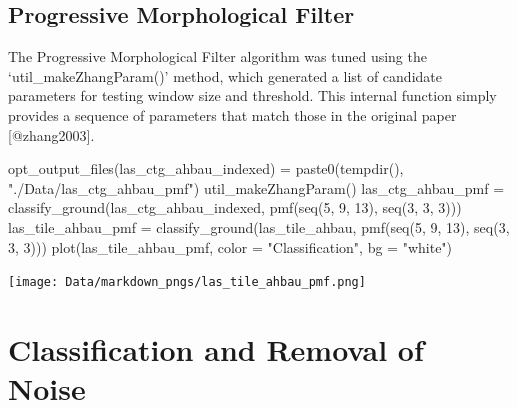 \documentclass[
]{article}
\newenvironment{Shaded}{\begin{snugshade}}{\end{snugshade}}
\newcommand{\AttributeTok}[1]{\textcolor[rgb]{0.77,0.63,0.00}{#1}}
\newcommand{\DecValTok}[1]{\textcolor[rgb]{0.00,0.00,0.81}{#1}}
\newcommand{\FunctionTok}[1]{\textcolor[rgb]{0.00,0.00,0.00}{#1}}
\newcommand{\NormalTok}[1]{#1}
\newcommand{\OtherTok}[1]{\textcolor[rgb]{0.56,0.35,0.01}{#1}}
\newcommand{\StringTok}[1]{\textcolor[rgb]{0.31,0.60,0.02}{#1}}
\begin{document}
\hypertarget{progressive-morphological-filter}{%
\subsection{Progressive Morphological
Filter}\label{progressive-morphological-filter}}

The Progressive Morphological Filter algorithm was tuned using the
`util\_makeZhangParam()' method, which generated a list of candidate
parameters for testing window size and threshold. This internal function
simply provides a sequence of parameters that match those in the
original paper {[}@zhang2003{]}.

\begin{Shaded}
\begin{Highlighting}[]
\FunctionTok{opt\_output\_files}\NormalTok{(las\_ctg\_ahbau\_indexed) }\OtherTok{=}  \FunctionTok{paste0}\NormalTok{(}\FunctionTok{tempdir}\NormalTok{(), }\StringTok{"./Data/las\_ctg\_ahbau\_pmf"}\NormalTok{)}
\FunctionTok{util\_makeZhangParam}\NormalTok{()}
\NormalTok{las\_ctg\_ahbau\_pmf }\OtherTok{=} \FunctionTok{classify\_ground}\NormalTok{(las\_ctg\_ahbau\_indexed, }\FunctionTok{pmf}\NormalTok{(}\FunctionTok{seq}\NormalTok{(}\DecValTok{5}\NormalTok{, }\DecValTok{9}\NormalTok{, }\DecValTok{13}\NormalTok{), }\FunctionTok{seq}\NormalTok{(}\DecValTok{3}\NormalTok{, }\DecValTok{3}\NormalTok{, }\DecValTok{3}\NormalTok{)))}
\NormalTok{las\_tile\_ahbau\_pmf }\OtherTok{=} \FunctionTok{classify\_ground}\NormalTok{(las\_tile\_ahbau, }\FunctionTok{pmf}\NormalTok{(}\FunctionTok{seq}\NormalTok{(}\DecValTok{5}\NormalTok{, }\DecValTok{9}\NormalTok{, }\DecValTok{13}\NormalTok{), }\FunctionTok{seq}\NormalTok{(}\DecValTok{3}\NormalTok{, }\DecValTok{3}\NormalTok{, }\DecValTok{3}\NormalTok{)))}
\FunctionTok{plot}\NormalTok{(las\_tile\_ahbau\_pmf, }\AttributeTok{color =} \StringTok{"Classification"}\NormalTok{, }\AttributeTok{bg =} \StringTok{"white"}\NormalTok{) }
\end{Highlighting}
\end{Shaded}

\texttt{[image: Data/markdown\_pngs/las\_tile\_ahbau\_pmf.png]}

\hypertarget{classification-and-removal-of-noise}{%
\section{Classification and Removal of
Noise}\label{classification-and-removal-of-noise}}
\end{document}
